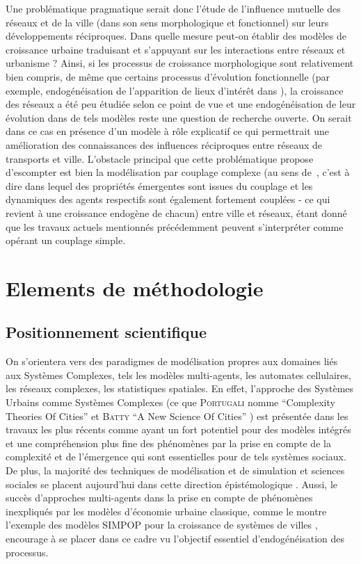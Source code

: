 \documentclass[french,12pt]{article}
\newcommand{\noun}[1]{\textsc{#1}}
\begin{document}
Une problématique pragmatique serait donc l'étude de l'influence mutuelle des réseaux et de la ville (dans son sens morphologique et fonctionnel) sur leurs développements réciproques. Dans quelle mesure peut-on établir des modèles de croissance urbaine traduisant et s'appuyant sur les interactions entre réseaux et urbanisme ? Ainsi, si les processus de croissance morphologique sont relativement bien compris, de même que certains processus d'évolution fonctionnelle (par exemple, endogénéisation de l'apparition de lieux d'intérêt dans \cite{bonin2012modele}), la croissance des réseaux a été peu étudiée selon ce point de vue et une endogénéisation de leur évolution dans de tels modèles reste une question de recherche ouverte. On serait dans ce cas en présence d'un modèle à rôle explicatif ce qui permettrait une amélioration des connaissances des influences réciproques entre réseaux de transports et ville. L’obstacle principal que cette problématique propose d’escompter est bien la modélisation par couplage complexe (au sens  de~\cite{varenne2013modeliser}, c’est à dire dans lequel des propriétés émergentes sont issues du couplage et les dynamiques des agents respectifs sont également fortement couplées - ce qui revient à une croissance endogène de chacun) entre ville et réseaux, étant donné que les travaux actuels mentionnés précédemment peuvent s’interpréter comme opérant un couplage simple.




\section{Elements de méthodologie}

\subsection{Positionnement scientifique}

On s'orientera vers des paradigmes de modélisation propres aux domaines liés aux Systèmes Complexes, tels les modèles multi-agents, les automates cellulaires, les réseaux complexes, les statistiques spatiales. En effet, l'approche des Systèmes Urbains comme Systèmes Complexes (ce que \noun{Portugali} nomme ``Complexity Theories Of Cities'' \cite{portugali2012complexity} et \noun{Batty} ``A New Science Of Cities'' \cite{batty2013new}) est présentée dans les travaux les plus récents comme ayant un fort potentiel pour des modèles intégrés et une compréhension plus fine des phénomènes par la prise en compte de la complexité et de l'émergence qui sont essentielles pour de tels systèmes sociaux. De plus, la majorité des techniques de modélisation et de simulation et sciences sociales se placent aujourd'hui dans cette direction épistémologique \cite{varenne2010simulations}. Aussi, le succès d'approches multi-agents dans la prise en compte de phénomènes inexpliqués par les modèles d'économie urbaine classique, comme le montre l'exemple des modèles SIMPOP pour la croissance de systèmes de villes \cite{pumain2012multi}, encourage à se placer dans ce cadre vu l'objectif essentiel d'endogénéisation des processus.
\end{document}
